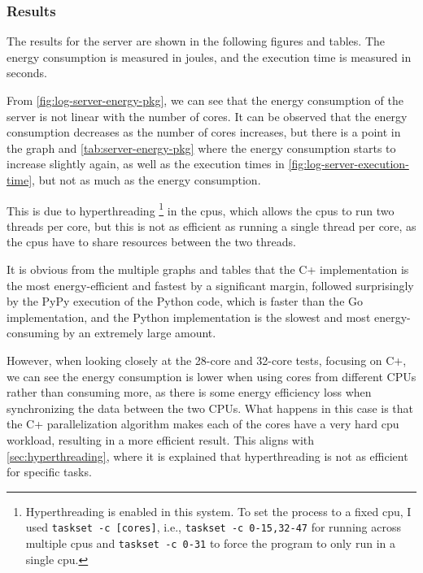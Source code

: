 \subsubsection{Results}

\newlength{\plotwidthgraph}
\newlength{\plotheightgraph}
\setlength{\plotwidthgraph}{14cm}
\setlength{\plotheightgraph}{8cm}

The results for the server are shown in the following figures and tables. The energy consumption is measured in joules, and the execution time is measured in seconds. 









From \autoref{fig:log-server-energy-pkg}, we can see that the energy consumption of the server is not linear with the number of cores. It can be observed that the energy consumption decreases as the number of cores increases, but there is a point in the graph and \autoref{tab:server-energy-pkg} where the energy consumption starts to increase slightly again, as well as the execution times in \autoref{fig:log-server-execution-time}, but not as much as the energy consumption.

This is due to hyperthreading \footnote{Hyperthreading is enabled in this system. To set the process to a fixed \gls{cpu}, I used \texttt{taskset -c [cores]}, i.e., \texttt{taskset -c 0-15,32-47} for running across multiple \glspl{cpu} and \texttt{taskset -c 0-31} to force the program to only run in a single \gls{cpu}.} in the \glspl{cpu}, which allows the \glspl{cpu} to run two threads per core, but this is not as efficient as running a single thread per core, as the \glspl{cpu} have to share resources between the two threads.

It is obvious from the multiple graphs and tables that the C\++ implementation is the most energy-efficient and fastest by a significant margin, followed surprisingly by the PyPy execution of the Python code, which is faster than the Go implementation, and the Python implementation is the slowest and most energy-consuming by an extremely large amount.

However, when looking closely at the 28-core and 32-core tests, focusing on C\++, we can see the energy consumption is lower when using cores from different CPUs rather than consuming more, as there is some energy efficiency loss when synchronizing the data between the two CPUs. What happens in this case is that the C\++ parallelization algorithm makes each of the cores have a very hard \gls{cpu} workload, resulting in a more efficient result. This aligns with \autoref{sec:hyperthreading}, where it is explained that hyperthreading is not as efficient for specific tasks.

